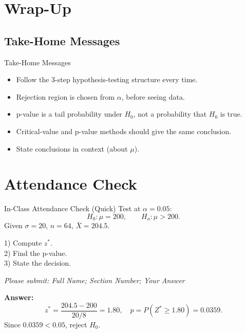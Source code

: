 \documentclass[aspectratio=169]{beamer}
\begin{document}
\section{Wrap-Up}

\subsection{Take-Home Messages}
\begin{frame}{Take-Home Messages}
  \begin{itemize}
    \item Follow the 3-step hypothesis-testing structure every time.
    \item Rejection region is chosen from \(\alpha\), before seeing data.
    \item p-value is a tail probability under \(H_0\), not a probability that \(H_0\) is true.
    \item Critical-value and p-value methods should give the same conclusion.
    \item State conclusions in context (about \(\mu\)).
  \end{itemize}
\end{frame}

\section{Attendance Check}

\begin{frame}{In-Class Attendance Check (Quick)}
  Test at \(\alpha=0.05\):
  \[
    H_0:\mu=200,
    \qquad
    H_a:\mu>200.
  \]
  Given \(\sigma=20\), \(n=64\), \(\bar X=204.5\).

  \vspace{1mm}
  1) Compute \(z^*\).\\
  2) Find the p-value.\\
  3) State the decision.

  \vspace{3mm}
  \textit{Please submit: Full Name; Section Number; Your Answer}

  \pause
  \vspace{2mm}
  \textbf{Answer:}
  \[
    z^*=\frac{204.5-200}{20/8}=1.80,
    \quad
    p=P(Z^*\ge 1.80)=0.0359.
  \]
  Since \(0.0359<0.05\), reject \(H_0\).
\end{frame}
\end{document}
